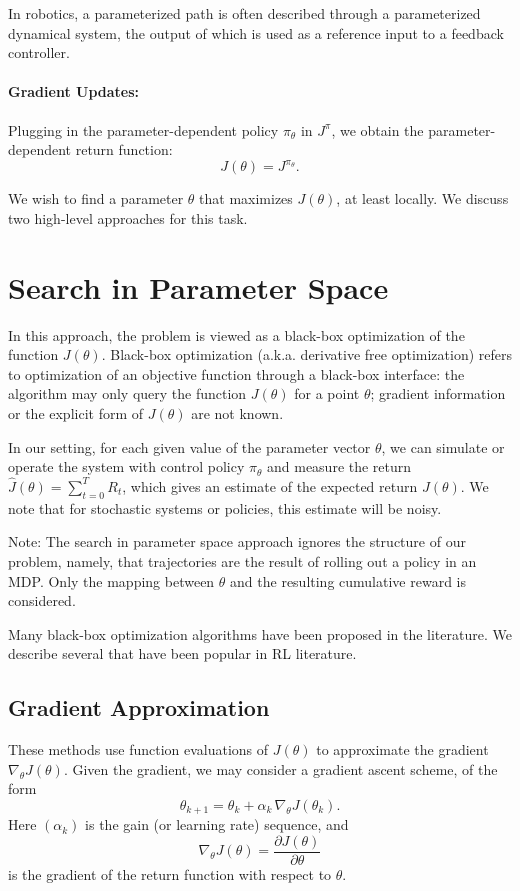 In robotics, a parameterized path is often described through a parameterized dynamical system, the output of which is used as a reference input to a feedback controller.

\paragraph{Gradient Updates:}  Plugging in the parameter-dependent policy ${\pi _\theta }$ in ${J^\pi }$,  we obtain the parameter-dependent return function:
\[J(\theta ) = {J^{{\pi _\theta }}}.\]

We wish to find a parameter $\theta $ that maximizes $J(\theta )$, at least locally. We discuss two high-level approaches for this task.

\section{Search in Parameter Space}
In this approach, the problem is viewed as a black-box optimization of the function $J(\theta )$.
Black-box optimization (a.k.a. derivative free optimization) refers to optimization of an objective function through a black-box interface: the algorithm may only query the function $J(\theta )$ for a point $\theta$; gradient information or the explicit form of $J(\theta)$ are not known. 

In our setting, for each given value of the parameter vector $\theta $, we can simulate or operate the system with control policy ${\pi _\theta }$ and measure the return  $\hat J(\theta ) = \sum\nolimits_{t = 0}^T {{R_t}} $, which gives an estimate of the expected return $J(\theta )$. We note that for stochastic systems or policies, this estimate will be noisy.

Note: The search in parameter space approach ignores the structure of our problem, namely, that trajectories are the result of rolling out a policy in an MDP. Only the mapping between $\theta$ and the resulting cumulative reward is considered.

Many black-box optimization algorithms have been proposed in the literature. We describe several that have been popular in RL literature.

\subsection{Gradient Approximation}

These methods use function evaluations of $J(\theta )$ to approximate the gradient ${\nabla _\theta }J(\theta )$.
Given the gradient, we may consider a gradient ascent scheme, of the form
\begin{equation}\label{eq:grad_ascent_scheme}
{\theta _{k + 1}} = {\theta _k} + {\alpha _k}\,{\nabla _\theta }J({\theta _k}).
\end{equation}
Here  $({\alpha _k})$ is the gain (or learning rate) sequence, and
\[{\nabla _\theta }J(\theta ) = \frac{{\partial J(\theta )}}{{\partial \theta }}\]
is the gradient of the return function with respect to $\theta $.

